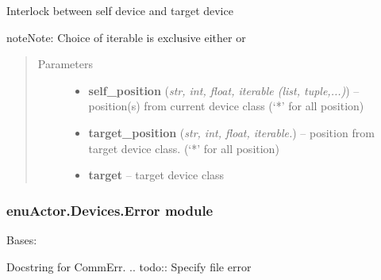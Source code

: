 \documentclass[letterpaper,10pt,english]{sphinxmanual}
\begin{document}

\begin{fulllineitems}
\label{enuActor.Devices:enuActor.Devices.Device.interlock}
Interlock between self device and target device

\begin{notice}{note}{Note:}
Choice of iterable is exclusive either     or 
\end{notice}
\begin{quote}\begin{description}
\item[{Parameters}] \leavevmode\begin{itemize}
\item {} 
\textbf{self\_position} (\emph{str, int, float, iterable (list, tuple,...)}) -- position(s) from current device class (`*' for all position)

\item {} 
\textbf{target\_position} (\emph{str, int, float, iterable.}) -- position from target device class. (`*' for all position)

\item {} 
\textbf{target} -- target device class

\end{itemize}

\end{description}\end{quote}

\end{fulllineitems}



\subsubsection{enuActor.Devices.Error module}
\label{enuActor.Devices:enuactor-devices-error-module}\label{enuActor.Devices:module-enuActor.Devices.Error}

\begin{fulllineitems}
\label{enuActor.Devices:enuActor.Devices.Error.CfgFileErr}
Bases: {\hyperref[enuActor.Devices:enuActor.Devices.Error.RuleError]{}}

Docstring for CommErr.
.. todo:: Specify file error

\end{fulllineitems}
\end{document}
